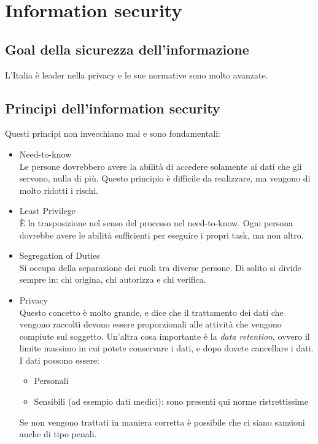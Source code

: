 \chapter{Information security}

\section{Goal della sicurezza dell'informazione}

L'Italia è leader nella privacy e le sue normative sono molto avanzate.

\section{Principi dell'information security}

Questi principi non invecchiano mai e sono fondamentali:
\begin{itemize}
  \item Need-to-know \\
  Le persone dovrebbero avere la abilità di accedere solamente ai dati che gli 
  servono, nulla di più. Questo principio è difficile da realizzare, ma vengono 
  di molto ridotti i rischi.
  \item Least Privilege \\
  È la trasposizione nel senso del processo nel need-to-know. Ogni persona 
  dovrebbe avere le abilità sufficienti per eseguire i propri task, ma non 
  altro.
  \item Segregation of Duties \\
  Si occupa della separazione dei ruoli tra diverse persone. Di solito si 
  divide sempre in: chi origina, chi autorizza e chi verifica.
  \item Privacy \\
  Questo concetto è molto grande, e dice che il trattamento dei dati che 
  vengono raccolti devono essere proporzionali alle attività che vengono 
  compiute sul soggetto. Un'altra cosa importante è la \textit{data retention}, 
  ovvero il limite massimo in cui potete conservare i dati, e dopo dovete 
  cancellare i dati. I dati possono essere:
  \begin{itemize}
    \item Personali
    \item Sensibili (ad esempio dati medici): sono presenti qui norme 
    ristrettissime
  \end{itemize}
  Se non vengono trattati in maniera corretta è possibile che ci siano sanzioni 
  anche di tipo penali.
\end{itemize}

